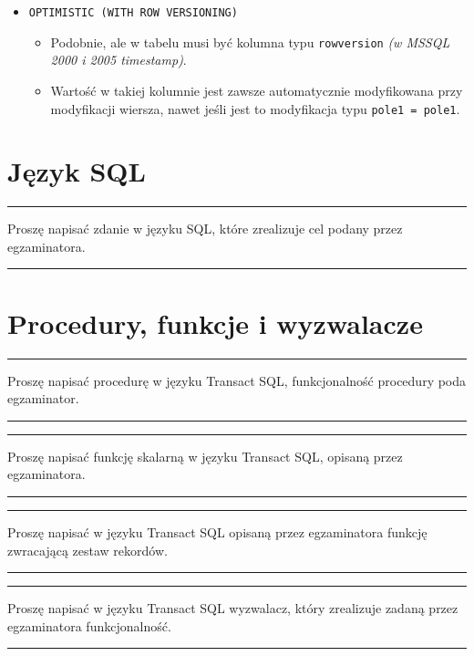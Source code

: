 \documentclass[a5paper,6pt]{article}
\newcommand{\horrule}[1]{\rule{\linewidth}{#1}}
\begin{document}
\begin{itemize}
        \pagebreak
        \item \texttt{OPTIMISTIC (WITH ROW VERSIONING)}
        \begin{itemize}
            \item Podobnie, ale w tabelu musi być kolumna typu
                  \texttt{rowversion} \textit{(w MSSQL 2000 i 2005 timestamp)}.
            \item Wartość w takiej kolumnie jest zawsze automatycznie
                  modyfikowana przy modyfikacji wiersza, nawet jeśli jest to
                  modyfikacja typu \texttt{pole1 = pole1}.
        \end{itemize}

    \end{itemize}



\pagebreak

    \section{Język SQL} %
    \label{sec:jezyk_sql}

    \horrule{0.5pt}
    Proszę napisać zdanie w języku SQL, które zrealizuje cel podany przez
    egzaminatora.\\
    \horrule{0.5pt}



    \section{Procedury, funkcje i wyzwalacze} %
    \label{sec:procedury_funkcje_i_wyzwalacze}

    \horrule{0.5pt}
    Proszę napisać procedurę w języku Transact SQL, funkcjonalność procedury
    poda egzaminator.\\
    \horrule{0.5pt}

    \horrule{0.5pt}
    Proszę napisać funkcję skalarną w języku Transact SQL, opisaną przez egzaminatora.\\
    \horrule{0.5pt}

    \horrule{0.5pt}
    Proszę napisać w języku Transact SQL opisaną przez egzaminatora funkcję zwracającą zestaw rekordów.\\
    \horrule{0.5pt}

    \horrule{0.5pt}
    Proszę napisać w języku Transact SQL wyzwalacz, który zrealizuje zadaną
    przez egzaminatora funkcjonalność.\\
    \horrule{0.5pt}
\end{document}
